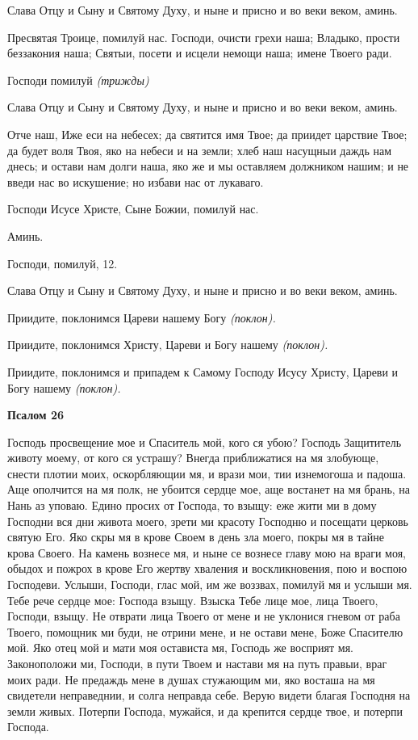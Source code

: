 Слава Отцу и Сыну и Святому Духу, и ныне и присно и во веки веком, аминь.


Пресвятая Троице, помилуй нас. Господи, очисти грехи наша; Владыко, прости беззакония наша; Святыи, посети и исцели немощи наша; имене Твоего ради.


Господи помилуй \itshape (трижды)\normalfont{}


Слава Отцу и Сыну и Святому Духу, и ныне и присно и во веки веком, аминь.


Отче наш, Иже еси на небесех; да святится имя Твое; да приидет царствие Твое; да будет воля Твоя, яко на небеси и на земли; хлеб наш насущныи даждь нам днесь; и остави нам долги наша, яко же и мы оставляем должником нашим; и не введи нас во искушение; но избави нас от лукаваго.


Господи Исусе Христе, Сыне Божии, помилуй нас.


Аминь.


Господи, помилуй, 12.


Слава Отцу и Сыну и Святому Духу, и ныне и присно и во веки веком, аминь.


Приидите, поклонимся Цареви нашему Богу \itshape (поклон)\normalfont{}.


Приидите, поклонимся Христу, Цареви и Богу нашему \itshape (поклон)\normalfont{}.


Приидите, поклонимся и припадем к Самому Господу Исусу Христу, Цареви и Богу нашему \itshape (поклон)\normalfont{}.





\bfseries Псалом 26\normalfont{}


Господь просвещение мое и Спаситель мой, кого ся убою? Господь Защититель животу моему, от кого ся устрашу? Внегда приближатися на мя злобующе, снести плотии моих, оскорбляющии мя, и врази мои, тии изнемогоша и падоша. Аще ополчится на мя полк, не убоится сердце мое, аще востанет на мя брань, на Нань аз уповаю. Едино просих от Господа, то взыщу: еже жити ми в дому Господни вся дни живота моего, зрети ми красоту Господню и посещати церковь святую Его. Яко скры мя в крове Своем в день зла моего, покры мя в тайне крова Своего. На камень вознесе мя, и ныне се вознесе главу мою на враги моя, обыдох и пожрох в крове Его жертву хваления и воскликновения, пою и воспою Господеви. Услыши, Господи, глас мой, им же воззвах, помилуй мя и услыши мя. Тебе рече сердце мое: Господа взыщу. Взыска Тебе лице мое, лица Твоего, Господи, взыщу. Не отврати лица Твоего от мене и не уклонися гневом от раба Твоего, помощник ми буди, не отрини мене, и не остави мене, Боже Спасителю мой. Яко отец мой и мати моя остависта мя, Господь же восприят мя. Законоположи ми, Господи, в пути Твоем и настави мя на путь правыи, враг моих ради. Не предаждь мене в душах стужающим ми, яко восташа на мя свидетели неправеднии, и солга неправда себе. Верую видети благая Господня на земли живых. Потерпи Господа, мужайся, и да крепится сердце твое, и потерпи Господа.





